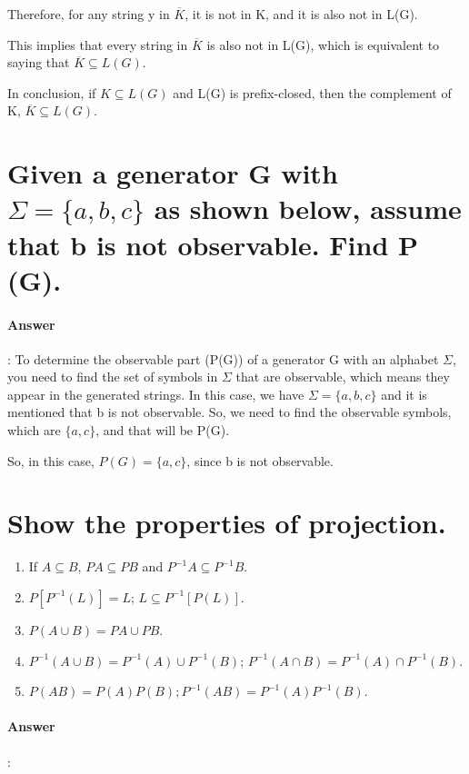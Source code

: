 \documentclass{article}
\begin{document}
Therefore, for any string y in $\overline{K}$, it is not in K, and it is also not in L(G).

This implies that every string in $\overline{K}$ is also not in L(G), which is equivalent to saying that $\overline{K} \subseteq L(G)$.

In conclusion, if $K \subseteq L(G)$ and L(G) is prefix-closed, then the complement of K, $\overline{K} \subseteq L(G)$.

\section{Given a generator G with $\Sigma = \{a, b, c\}$ as shown below, assume that b is not observable. Find P (G).}

\paragraph{Answer}:
To determine the observable part (P(G)) of a generator G with an alphabet $\Sigma$, you need to find the set of symbols in $\Sigma$ that are observable, which means they appear in the generated strings. In this case, we have $\Sigma = \{a, b, c\}$ and it is mentioned that b is not observable. So, we need to find the observable symbols, which are $\{a, c\}$, and that will be P(G).

So, in this case, $P(G) = \{a, c\}$, since b is not observable.

\section{Show the properties of projection.}

\begin{enumerate}
  \item If $A \subseteq B$, $P A \subseteq P B$ and $P^{-1}A \subseteq P^{-1}B$.
  \item $P [P^{-1}(L)] = L$; $L \subseteq P^{-1}[P (L)]$.
  \item $P (A \cup B) = P A \cup P B$.
  \item $P^{-1} (A \cup B) = P^{-1} (A) \cup P^{-1} (B)$; $P^{-1} (A \cap B) = P^{-1} (A) \cap P^{-1} (B)$.
  \item $P (AB) = P (A)P (B); P^{-1} (AB) = P^{-1} (A)P^{-1}(B)$.
\end{enumerate}

\paragraph{Answer}:
\end{document}
